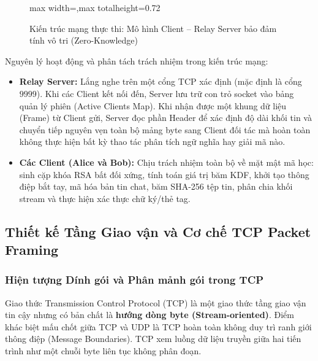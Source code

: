 \documentclass[a4paper,12pt]{article}
\newenvironment{fitdiagram}
    {\begin{adjustbox}{max width=\linewidth,max totalheight=0.72\textheight}}
    {\end{adjustbox}}
\begin{document}
\begin{figure}[H]
\begin{fitdiagram}
\end{fitdiagram}
\caption{Kiến trúc mạng thực thi: Mô hình Client -- Relay Server bảo đảm tính vô tri (Zero-Knowledge)}
\label{fig:network_architecture}
\end{figure}

Nguyên lý hoạt động và phân tách trách nhiệm trong kiến trúc mạng:
\begin{itemize}
    \item \textbf{Relay Server:} Lắng nghe trên một cổng TCP xác định (mặc định là cổng $9999$). Khi các Client kết nối đến, Server lưu trữ con trỏ socket vào bảng quản lý phiên (Active Clients Map). Khi nhận được một khung dữ liệu (Frame) từ Client gửi, Server đọc phần Header để xác định độ dài khối tin và chuyển tiếp nguyên vẹn toàn bộ mảng byte sang Client đối tác mà hoàn toàn không thực hiện bất kỳ thao tác phân tích ngữ nghĩa hay giải mã nào.
    \item \textbf{Các Client (Alice và Bob):} Chịu trách nhiệm toàn bộ về mặt mật mã học: sinh cặp khóa RSA bất đối xứng, tính toán giá trị băm KDF, khởi tạo thông điệp bắt tay, mã hóa bản tin chat, băm SHA-256 tệp tin, phân chia khối stream và thực hiện xác thực chữ ký/thẻ tag.
\end{itemize}

\subsection{Thiết kế Tầng Giao vận và Cơ chế TCP Packet Framing}

\subsubsection{Hiện tượng Dính gói và Phân mảnh gói trong TCP}
Giao thức Transmission Control Protocol (TCP) là một giao thức tầng giao vận tin cậy nhưng có bản chất là \textbf{hướng dòng byte (Stream-oriented)}. Điểm khác biệt mấu chốt giữa TCP và UDP là TCP hoàn toàn không duy trì ranh giới thông điệp (Message Boundaries). TCP xem luồng dữ liệu truyền giữa hai tiến trình như một chuỗi byte liên tục không phân đoạn.
\end{document}
